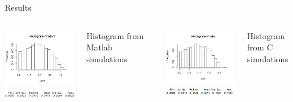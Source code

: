\begin{frame}{Results}
 

  \begin{columns}[t]
    \includegraphics[width=6cm]{img/shrimpHistMATLAB} \\
		\includegraphics[width=5.5cm]{img/histSummML}
    \begin{center} Histogram from Matlab simulations \end{center}
    \includegraphics[width=6cm]{img/Rplot} \\
		\includegraphics[width=5.5cm]{img/sumAMAN}
    \begin{center} Histogram from C simulations \end{center}
  \end{columns}


\end{frame}